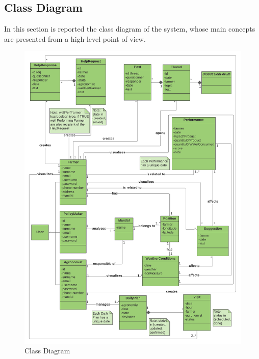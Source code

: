\subsection{Class Diagram}

In this section is reported the class diagram of the system, whose main concepts are presented from a high-level point of view. 
\begin{figure}[H]
  \includegraphics[width=128.5mm,scale=0.9]{./Images/Class Diagram RASD new version.png}
  \caption{Class Diagram}
\end{figure}

\newpage


